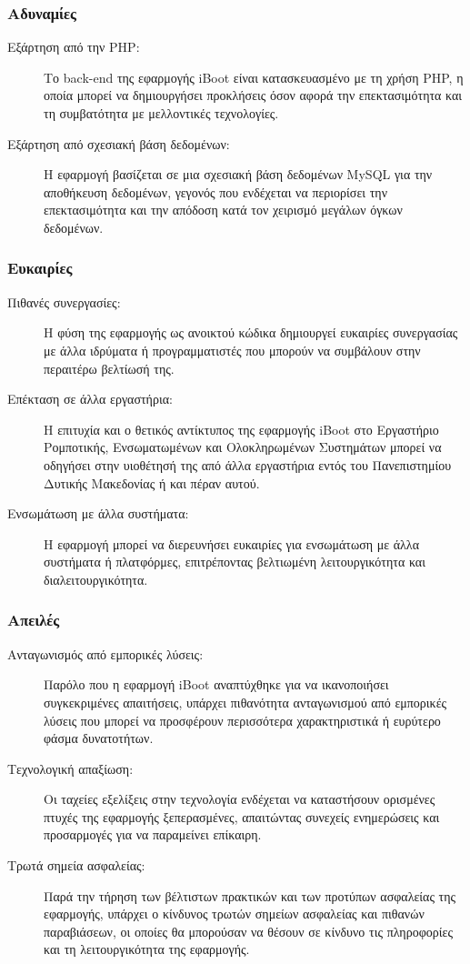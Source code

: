 \subsubsection{Αδυναμίες}
\begin{description}
	\item[Εξάρτηση από την PHP:] Το back-end της εφαρμογής iBoot είναι κατασκευασμένο με τη χρήση PHP, η οποία μπορεί να δημιουργήσει προκλήσεις όσον αφορά την επεκτασιμότητα και τη συμβατότητα με μελλοντικές τεχνολογίες.
	\item[Εξάρτηση από σχεσιακή βάση δεδομένων:] Η εφαρμογή βασίζεται σε μια σχεσιακή βάση δεδομένων MySQL για την αποθήκευση δεδομένων, γεγονός που ενδέχεται να περιορίσει την επεκτασιμότητα και την απόδοση κατά τον χειρισμό μεγάλων όγκων δεδομένων.
\end{description}

\subsubsection{Ευκαιρίες}
\begin{description}
	\item[Πιθανές συνεργασίες:] Η φύση της εφαρμογής ως ανοικτού κώδικα δημιουργεί ευκαιρίες συνεργασίας με άλλα ιδρύματα ή προγραμματιστές που μπορούν να συμβάλουν στην περαιτέρω βελτίωσή της.
	\item[Επέκταση σε άλλα εργαστήρια:] Η επιτυχία και ο θετικός αντίκτυπος της εφαρμογής iBoot στο Εργαστήριο Ρομποτικής, Ενσωματωμένων και Ολοκληρωμένων Συστημάτων μπορεί να οδηγήσει στην υιοθέτησή της από άλλα εργαστήρια εντός του Πανεπιστημίου Δυτικής Μακεδονίας ή και πέραν αυτού.
	\item[Ενσωμάτωση με άλλα συστήματα:] Η εφαρμογή μπορεί να διερευνήσει ευκαιρίες για ενσωμάτωση με άλλα συστήματα ή πλατφόρμες, επιτρέποντας βελτιωμένη λειτουργικότητα και διαλειτουργικότητα.
\end{description}

\subsubsection{Απειλές}
\begin{description}
	\item[Ανταγωνισμός από εμπορικές λύσεις:] Παρόλο που η εφαρμογή iBoot αναπτύχθηκε για να ικανοποιήσει συγκεκριμένες απαιτήσεις, υπάρχει πιθανότητα ανταγωνισμού από εμπορικές λύσεις που μπορεί να προσφέρουν περισσότερα χαρακτηριστικά ή ευρύτερο φάσμα δυνατοτήτων.
	\item[Τεχνολογική απαξίωση:] Οι ταχείες εξελίξεις στην τεχνολογία ενδέχεται να καταστήσουν ορισμένες πτυχές της εφαρμογής ξεπερασμένες, απαιτώντας συνεχείς ενημερώσεις και προσαρμογές για να παραμείνει επίκαιρη.
	\item[Τρωτά σημεία ασφαλείας:] Παρά την τήρηση των βέλτιστων πρακτικών και των προτύπων ασφαλείας της εφαρμογής, υπάρχει ο κίνδυνος τρωτών σημείων ασφαλείας και πιθανών παραβιάσεων, οι οποίες θα μπορούσαν να θέσουν σε κίνδυνο τις πληροφορίες και τη λειτουργικότητα της εφαρμογής.
\end{description}

